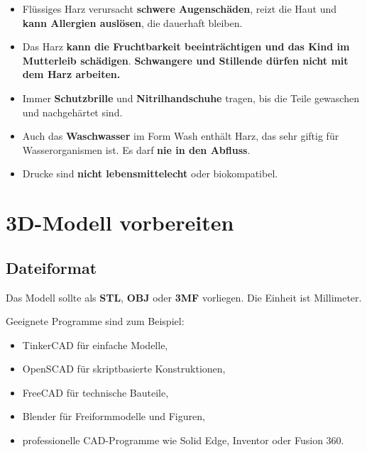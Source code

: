 \documentclass{\basedir/fablab-document}
\begin{document}
\begin{itemize}
	\item Flüssiges Harz verursacht \textbf{schwere Augenschäden}, reizt die Haut und \textbf{kann Allergien auslösen}, die dauerhaft bleiben.
	\item Das Harz \textbf{kann die Fruchtbarkeit beeinträchtigen und das Kind im Mutterleib schädigen}. \textbf{Schwangere und Stillende dürfen nicht mit dem Harz arbeiten.}
	\item Immer \textbf{Schutzbrille} und \textbf{Nitrilhandschuhe} tragen, bis die Teile gewaschen und nachgehärtet sind.
	\item Auch das \textbf{Waschwasser} im Form Wash enthält Harz, das sehr giftig für Wasserorganismen ist. Es darf \textbf{nie in den Abfluss}.
	\item Drucke sind \textbf{nicht lebensmittelecht} oder biokompatibel.
\end{itemize}


\newpage


\renewcommand{\contentsname}{Inhaltsverzeichnis / Arbeitsablauf}
\setcounter{tocdepth}{2}
\tableofcontents
\newpage

\section{3D-Modell vorbereiten}

\subsection{Dateiformat}

Das Modell sollte als \textbf{STL}, \textbf{OBJ} oder \textbf{3MF} vorliegen. Die Einheit ist Millimeter.

Geeignete Programme sind zum Beispiel:
\begin{itemize}
	\item TinkerCAD für einfache Modelle,
	\item OpenSCAD für skriptbasierte Konstruktionen,
	\item FreeCAD für technische Bauteile,
	\item Blender für Freiformmodelle und Figuren,
	\item professionelle CAD-Programme wie Solid Edge, Inventor oder Fusion 360.
\end{itemize}
\end{document}
